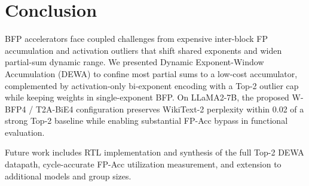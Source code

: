 \section{Conclusion}
\label{sec:conclusion}

BFP accelerators face coupled challenges from expensive inter-block FP accumulation and activation outliers that shift shared exponents and widen partial-sum dynamic range.
We presented Dynamic Exponent-Window Accumulation (DEWA) to confine most partial sums to a low-cost accumulator, complemented by activation-only bi-exponent encoding with a Top-2 outlier cap while keeping weights in single-exponent BFP.
On LLaMA2-7B, the proposed W-BFP4 / T2A-BiE4 configuration preserves WikiText-2 perplexity within 0.02 of a strong Top-2 baseline while enabling substantial FP-Acc bypass in functional evaluation.

Future work includes RTL implementation and synthesis of the full Top-2 DEWA datapath, cycle-accurate FP-Acc utilization measurement, and extension to additional models and group sizes.
